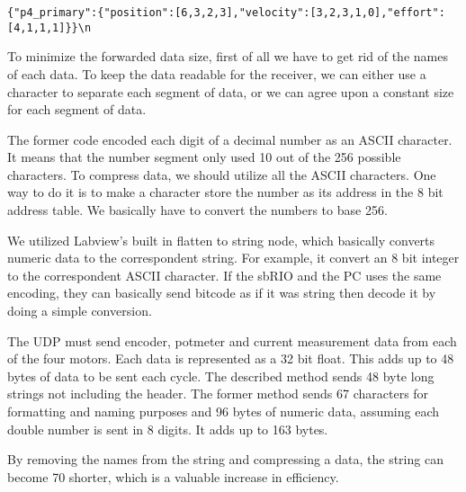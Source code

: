 \begin{verbatim}
{"p4_primary":{"position":[6,3,2,3],"velocity":[3,2,3,1,0],"effort":[4,1,1,1]}}\n
\end{verbatim}

To minimize the forwarded data size, first of all we have to get rid of the names of each data. To keep the data readable for the receiver, we can either use a character to separate each segment of data, or we can agree upon a constant size for each segment of data.

The former code encoded each digit of a decimal number as an ASCII character. It means that the number segment only used 10 out of the 256 possible characters. To compress data, we should utilize all the ASCII characters. One way to do it is to make a character store the number as its address in the 8 bit address table. We basically have to convert the numbers to base 256.

We utilized Labview's built in flatten to string node, which basically converts numeric data to the correspondent string. For example, it convert an 8 bit integer to the correspondent ASCII character. If the sbRIO and the PC uses the same encoding, they can basically send bitcode as if it was string then decode it by doing a simple conversion.  
 
The UDP must send encoder, potmeter and current measurement data from each of the four motors. Each data is represented as a 32 bit float. This adds up to 48 bytes of data to be sent each cycle. The described method sends 48 byte long strings not including the header. The former method sends 67 characters for formatting and naming purposes and 96 bytes of numeric data, assuming each double number is sent in 8 digits. It adds up to 163 bytes.

By removing the names from the string and compressing a data, the string can become 70 shorter, which is a valuable increase in efficiency.